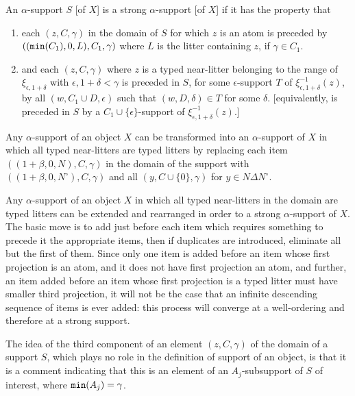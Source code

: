 \documentclass[12pt]{article}
\begin{document}
An $\alpha$-support $S$ [of $X$] is a strong $\alpha$-support [of $X$] if it has the property that 

\begin{enumerate}

\item each $(z,C,\gamma)$ in the domain of $S$ for which $z$ is
an atom is preceded by $(({\tt min}(C_1),0,L),C_1,\gamma)$ where $L$ is the litter containing $z$,  if $\gamma \in C_1$.

\item and each $(z,C,\gamma)$ where $z$ is a typed near-litter belonging to the range of $\xi_{\epsilon,1+\delta}$
with $\epsilon, 1+\delta<\gamma$ is preceded in $S$, for some $\epsilon$-support $T$ of $\xi_{\epsilon,1+\delta}^{-1}(z)$, by all $(w,C_1 \cup D,\epsilon)$ such that $(w,D,\delta) \in T$ for some $\delta$.  [equivalently, is preceded in $S$ by a $C_1 \cup \{\epsilon\}$-support of $\xi_{\epsilon,1+\delta}^{-1}(z)$.]

\end{enumerate}

Any $\alpha$-support of an object $X$ can be transformed into an $\alpha$-support of $X$ in which all typed near-litters are typed litters by replacing each item $((1+\beta,0,N),C,\gamma)$ in the domain of the support with
$((1+\beta,0,N^\circ),C,\gamma)$ and all $(y,C \cup \{0\},\gamma)$ for $y \in N \Delta N^\circ$.

Any $\alpha$-support of an object $X$ in which all typed near-litters in the domain are typed litters can be extended and rearranged in order to a strong $\alpha$-support of $X$.  The basic move is to add just before each item which requires something to precede it the appropriate items, then if duplicates are introduced, eliminate all but the first of them.   Since only one item is added before an item whose first projection is an atom, and it does not have first projection an atom, and further, an item added before an item whose first projection is a typed litter must have smaller third projection, it will not be the case that an infinite descending sequence of items is ever added:  this process will converge at a well-ordering and therefore at a strong support.

The idea of the third component of an element $(z,C,\gamma)$ of the domain of a support $S$, which plays no role
in the definition of support of an object, is that it is a comment indicating that this is an element of an $A_j$-subsupport of $S$ of interest, where ${\tt min}(A_j)=\gamma$.
\end{document}
